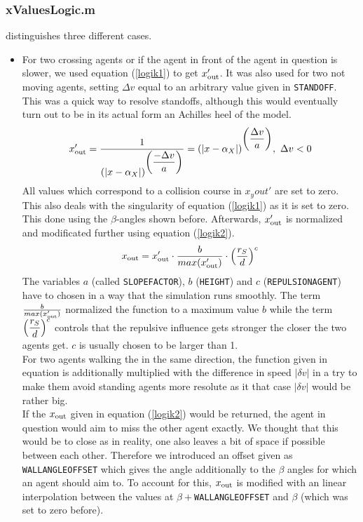 \subsubsection{xValuesLogic.m}
 distinguishes three different cases.
\begin{itemize}
	\item For two crossing agents or if the agent in front of the agent in question is slower, we used equation (\ref{logik1}) to get $x_{\text{out}}'$. It was also used for two not moving agents, setting $\Delta v$ equal to an arbitrary value given in \texttt{STANDOFF}. This was a quick way to resolve standoffs, although this would eventually turn out to be in its actual form an Achilles heel of the model.
	\begin{equation}\label{logik1}
		x_{\text{out}}' = \frac{1}{\displaystyle (|x - \alpha_X|)^{\displaystyle \left(\frac{-\Delta v}{a}\right)}} = (|x - \alpha_X|)^{\displaystyle \left(\frac{\Delta v}{a}\right)},\ \Delta v < 0
	\end{equation}
	\noi All values which correspond to a collision course in $x_y{out}'$ are set to zero. This also deals with the singularity of equation (\ref{logik1}) as it is set to zero. This done using the $\beta$-angles shown before. Afterwards, $x_{\text{out}}'$ is normalized and modificated further using equation (\ref{logik2}).
	\begin{equation}\label{logik2}
		x_{\text{out}} = x_{\text{out}}' \cdot \frac{b}{max(x_{\text{out}}')} \cdot \displaystyle \left(\frac{r_S}{d}\right)^c
	\end{equation}
	\noi The variables $a$ (called \texttt{SLOPEFACTOR}), $b$ (\texttt{HEIGHT}) and $c$ (\texttt{REPULSIONAGENT}) have to chosen in a way that the simulation runs smoothly. The term $\frac{b}{max(x_{\text{out}}')}$ normalized the function to a maximum value $b$ while the term $\displaystyle \left(\frac{r_S}{d}\right)^c$ controls that the repulsive influence gets stronger the closer the two agents get. $c$ is usually chosen to be larger than 1.\\
	For two agents walking the in the same direction, the function given in equation \label{logik2} is additionally multiplied with the difference in speed $|\delta v|$ in a try to make them avoid standing agents more resolute as it that case $|\delta v|$ would be rather big.\\
	
	\noi If the $x_{\text{out}}$ given in equation (\ref{logik2}) would be returned, the agent in question would aim to miss the other agent exactly. We thought that this would be to close as in reality, one also leaves a bit of space if possible between each other. Therefore we introduced an offset given as \texttt{WALLANGLEOFFSET} which gives the angle additionally to the $\beta$ angles for which an agent should aim to. To account for this, $x_{\text{out}}$ is modified with an linear interpolation between the values at $\beta + $\texttt{WALLANGLEOFFSET} and $\beta$ (which was set to zero before).


\end{itemize}
